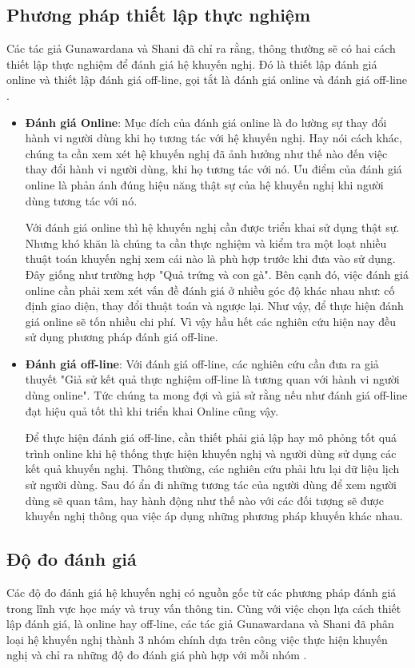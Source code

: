 \subsection{Phương pháp thiết lập thực nghiệm}
Các tác giả Gunawardana và Shani đã chỉ ra rằng, thông thường sẽ có hai cách thiết lập thực nghiệm để đánh giá hệ khuyến nghị. Đó là thiết lập đánh giá online và thiết lập đánh giá off-line, gọi tắt là đánh giá online và đánh giá off-line \cite{GunawardanaS09}. 
\begin{itemize}
\item \textbf{Đánh giá Online}: Mục đích của đánh giá online là đo lường sự thay đổi hành vi người dùng khi họ tương tác với hệ khuyến nghị. Hay nói cách khác, chúng ta cần xem xét hệ khuyến nghị đã ảnh hưởng như thế nào đến việc thay đổi hành vi người dùng, khi họ tương tác với nó. Ưu điểm của đánh giá online là phản ánh đúng hiệu năng thật sự của hệ khuyến nghị khi người dùng tương tác với nó. 

Với đánh giá online thì hệ khuyến nghị cần được triển khai sử dụng thật sự. Nhưng khó khăn là chúng ta cần thực nghiệm và kiểm tra một loạt nhiều thuật toán khuyến nghị xem cái nào là phù hợp trước khi đưa vào sử dụng. Đây giống như trường hợp "Quả trứng và con gà". Bên cạnh đó, việc đánh giá online cần phải xem xét vấn đề đánh giá ở nhiều góc độ khác nhau như: cố định giao diện, thay đổi thuật toán và ngược lại. Như vậy, để thực hiện đánh giá online sẽ tốn nhiều chi phí. Vì vậy hầu hết các nghiên cứu hiện nay đều sử dụng phương pháp đánh giá off-line.
\item \textbf{Đánh giá off-line}: Với đánh giá off-line, các nghiên cứu cần đưa ra giả thuyết "Giả sử kết quả thực nghiệm off-line là tương quan với hành vi người dùng online". Tức chúng ta mong đợi và giả sử rằng nếu như đánh giá off-line đạt hiệu quả tốt thì khi triển khai Online cũng vậy. 

Để thực hiện đánh giá off-line, cần thiết phải giả lập hay mô phỏng tốt quá trình online khi hệ thống thực hiện khuyến nghị và người dùng sử dụng các kết quả khuyến nghị. Thông thường, các nghiên cứu phải lưu lại dữ liệu lịch sử người dùng. Sau đó ẩn đi những tương tác của người dùng để xem người dùng sẽ quan tâm, hay hành động như thế nào với các đối tượng sẽ được khuyến nghị thông qua việc áp dụng những phương pháp khuyến khác nhau.
\end{itemize}

\subsection{Độ đo đánh giá}
Các độ đo đánh giá hệ khuyến nghị có nguồn gốc từ các phương pháp đánh giá trong lĩnh vực học máy và truy vấn thông tin. Cùng với việc chọn lựa cách thiết lập đánh giá, là online hay off-line, các tác giả Gunawardana và Shani đã phân loại hệ khuyến nghị thành 3 nhóm chính dựa trên công việc thực hiện khuyến nghị và chỉ ra những độ đo đánh giá phù hợp với mỗi nhóm \cite{GunawardanaS09}.

